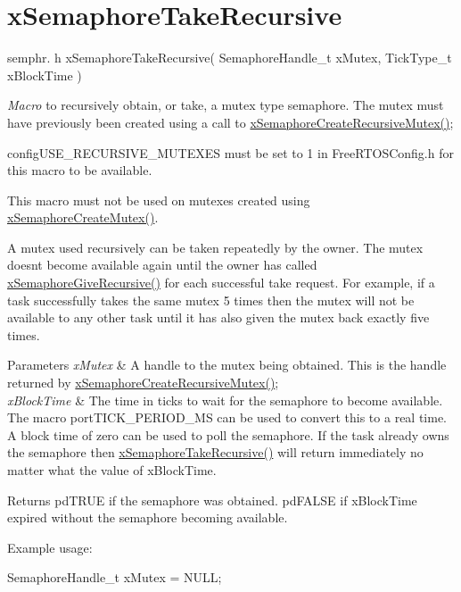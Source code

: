 \hypertarget{group__x_semaphore_take_recursive}{}\section{x\+Semaphore\+Take\+Recursive}
\label{group__x_semaphore_take_recursive}
semphr. h x\+Semaphore\+Take\+Recursive( Semaphore\+Handle\+\_\+t x\+Mutex, Tick\+Type\+\_\+t x\+Block\+Time )

{\itshape Macro} to recursively obtain, or \textquotesingle{}take\textquotesingle{}, a mutex type semaphore. The mutex must have previously been created using a call to \hyperlink{semphr_8h_a1bbc843be5a41ea83d2693b2189fc0f8}{x\+Semaphore\+Create\+Recursive\+Mutex()};

config\+U\+S\+E\+\_\+\+R\+E\+C\+U\+R\+S\+I\+V\+E\+\_\+\+M\+U\+T\+E\+X\+ES must be set to 1 in Free\+R\+T\+O\+S\+Config.\+h for this macro to be available.

This macro must not be used on mutexes created using \hyperlink{semphr_8h_aa6a00aa9b91a9e5b3ebe4ae1c3f115c6}{x\+Semaphore\+Create\+Mutex()}.

A mutex used recursively can be \textquotesingle{}taken\textquotesingle{} repeatedly by the owner. The mutex doesn\textquotesingle{}t become available again until the owner has called \hyperlink{semphr_8h_a398d66b17856c22dd49d39aaac42f105}{x\+Semaphore\+Give\+Recursive()} for each successful \textquotesingle{}take\textquotesingle{} request. For example, if a task successfully \textquotesingle{}takes\textquotesingle{} the same mutex 5 times then the mutex will not be available to any other task until it has also \textquotesingle{}given\textquotesingle{} the mutex back exactly five times.


\begin{DoxyParams}{Parameters}
{\em x\+Mutex} & A handle to the mutex being obtained. This is the handle returned by \hyperlink{semphr_8h_a1bbc843be5a41ea83d2693b2189fc0f8}{x\+Semaphore\+Create\+Recursive\+Mutex()};\\
\hline
{\em x\+Block\+Time} & The time in ticks to wait for the semaphore to become available. The macro port\+T\+I\+C\+K\+\_\+\+P\+E\+R\+I\+O\+D\+\_\+\+MS can be used to convert this to a real time. A block time of zero can be used to poll the semaphore. If the task already owns the semaphore then \hyperlink{semphr_8h_ad395f4bba51eea6af3397d72bc079e4d}{x\+Semaphore\+Take\+Recursive()} will return immediately no matter what the value of x\+Block\+Time.\\
\hline
\end{DoxyParams}
\begin{DoxyReturn}{Returns}
pd\+T\+R\+UE if the semaphore was obtained. pd\+F\+A\+L\+SE if x\+Block\+Time expired without the semaphore becoming available.
\end{DoxyReturn}
Example usage\+: 
\begin{DoxyPre}
SemaphoreHandle\_t xMutex = NULL;\end{DoxyPre}



